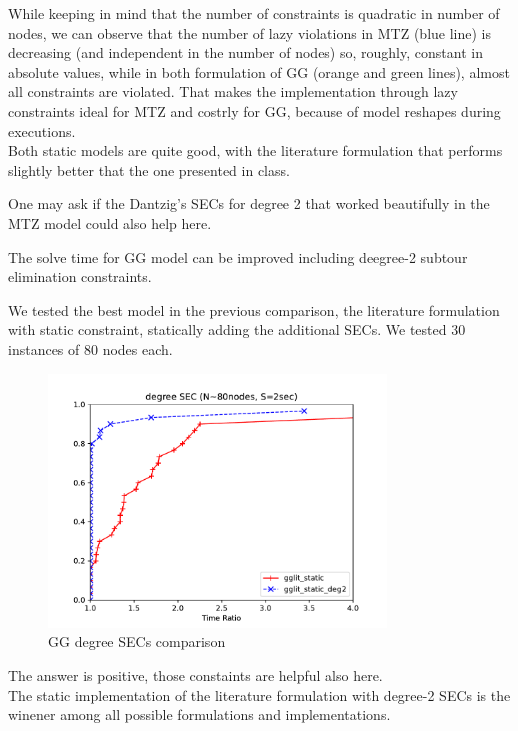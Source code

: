 While keeping in mind that the number of constraints is quadratic in number of
nodes, we can observe that the number of lazy violations in MTZ (blue line) is
decreasing (and independent in the number of nodes) so, roughly, constant in
absolute values, while in both formulation of GG  (orange and green lines),
almost all constraints are violated. That makes the implementation through lazy
constraints ideal for MTZ and costrly for GG, because of model reshapes during
executions.\\

Both static models are quite good, with the literature formulation that performs
slightly better that the one presented in class.


One may ask if the Dantzig's SECs for degree 2 that worked beautifully in the MTZ
model could also help here.

\begin{claim} 
    The solve time for GG model can be improved including deegree-2 subtour
    elimination constraints.
\end{claim}

We tested the best model in the previous comparison, the literature formulation
with static constraint, statically adding the additional SECs. We tested 30
instances of 80 nodes each.

\begin{figure}[h]
    \centering
    \includegraphics[width=0.8\textwidth]{figures/gg_comp2}
    \caption{GG degree SECs comparison}
\end{figure}

The answer is positive, those constaints are helpful also here. \\ 

The static implementation of the literature formulation with degree-2 SECs
is the winener among all possible formulations and implementations.


